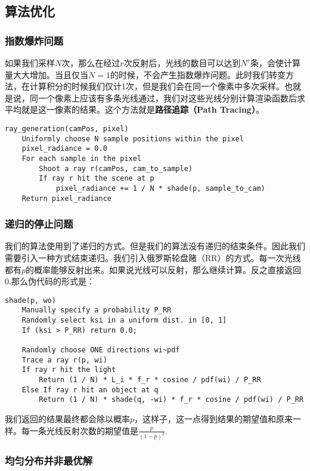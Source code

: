 \documentclass[openany]{progbookcn}
\begin{document}
\subsection{算法优化}

\subsubsection{指数爆炸问题}

如果我们采样$N$次，那么在经过$r$次反射后，光线的数目可以达到$N^r$条，会使计算量大大增加。当且仅当$N=1$的时候，不会产生指数爆炸问题。此时我们转变方法，在计算积分的时候我们仅计1次，但是我们会在同一个像素中多次采样。也就是说，同一个像素上应该有多条光线通过，我们对这些光线分别计算渲染函数后求平均就是这一像素的结果。这个方法就是\textbf{路径追踪（Path Tracing）}。

\begin{lstlisting}[caption=渲染函数解决指数爆炸伪代码]
ray_generation(camPos, pixel)
	Uniformly choose N sample positions within the pixel
	pixel_radiance = 0.0
	For each sample in the pixel
		Shoot a ray r(camPos, cam_to_sample)
		If ray r hit the scene at p
			pixel_radiance += 1 / N * shade(p, sample_to_cam)
	Return pixel_radiance
\end{lstlisting}

\subsubsection{递归的停止问题}
我们的算法使用到了递归的方式。但是我们的算法没有递归的结束条件。因此我们需要引入一种方式结束递归。我们引入俄罗斯轮盘赌（RR）的方式。每一次光线都有$p$的概率能够反射出来。如果说光线可以反射，那么继续计算。反之直接返回0.那么伪代码的形式是：

\begin{lstlisting}[caption=包含递归停止条件的渲染函数伪代码]
shade(p, wo)
	Manually specify a probability P_RR
	Randomly select ksi in a uniform dist. in [0, 1]
	If (ksi > P_RR) return 0.0;
	 
	Randomly choose ONE directions wi~pdf
	Trace a ray r(p, wi)
	If ray r hit the light
		Return (1 / N) * L_i * f_r * cosine / pdf(wi) / P_RR
	Else If ray r hit an object at q
		Return (1 / N) * shade(q, -wi) * f_r * cosine / pdf(wi) / P_RR
\end{lstlisting}

我们返回的结果最终都会除以概率$p$，这样子，这一点得到结果的期望值和原来一样。每一条光线反射次数的期望值是$\frac{p}{(1-p)^2}$.

\subsubsection{均匀分布并非最优解}
\end{document}
